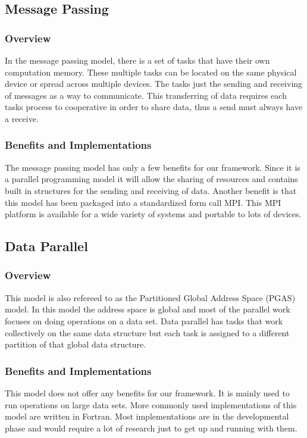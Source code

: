 \documentclass[draftclsnofoot, onecolumn, compsoc, 10pt]{IEEEtran}
\begin{document}
\subsection{Message Passing}
\subsubsection{Overview}
In the message passing model, there is a set of tasks that have their own computation memory. These multiple tasks can be located on the same physical device or spread across multiple devices. The tasks just the sending and receiving of messages as a way to communicate. This transferring of data requires each tasks process to cooperative in order to share data, thus a send must always have a receive. \cite{PP}
\subsubsection{Benefits and Implementations}
The message passing model has only a few benefits for our framework. Since it is a parallel programming model it will allow the sharing of resources and contains built in structures for the sending and receiving of data. Another benefit is that this model has been packaged into a standardized form call MPI. This MPI platform is available for a wide variety of systems and portable to lots of devices. \cite{PP}

\subsection{Data Parallel}
\subsubsection{Overview}
This model is also refereed to as the Partitioned Global Address Space (PGAS) model.\cite{PP} In this model the address space is global and most of the parallel work focuses on doing operations on a data set. Data parallel has tasks that work collectively on the same data structure but each task is assigned to a different partition of that global data structure. \cite{PP}
\subsubsection{Benefits and Implementations}
This model does not offer any benefits for our framework. It is mainly used to run operations on large data sets. More commonly used implementations of this model are written in Fortran. Most implementations are in the developmental phase and would require a lot of research just to get up and running with them. \cite{PP}
\end{document}
